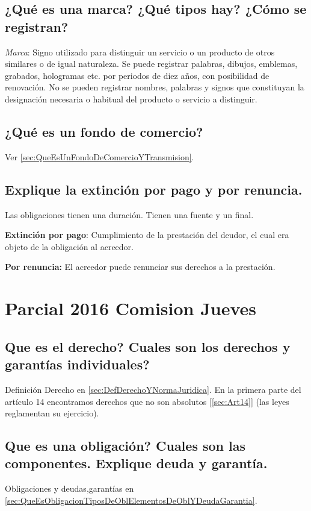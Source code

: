 \documentclass{article}
\begin{document}
\subsection{¿Qué es una marca? ¿Qué tipos hay? ¿Cómo se registran?}
\textit{Marca}: Signo utilizado para distinguir un servicio o un producto de otros similares o de igual naturaleza. Se puede registrar palabras, dibujos, emblemas, grabados, hologramas etc. por periodos de diez años, con posibilidad de renovación. 
	No se pueden registrar nombres, palabras y signos que constituyan la designación necesaria o habitual del producto o servicio a distinguir.

\subsection{¿Qué es un fondo de comercio?}
Ver \ref{sec:QueEsUnFondoDeComercioYTransmision}.
\subsection{Explique la extinción por pago y por renuncia.}
Las obligaciones tienen una duración. Tienen una fuente y un final. 

\textbf{Extinción por pago}: Cumplimiento de la prestación del deudor, el cual era objeto de la obligación al acreedor.

\textbf{Por renuncia:} El acreedor puede renunciar sus derechos a la prestación.


\section{Parcial 2016 Comision Jueves}
\subsection{Que es el derecho? Cuales son los derechos y garantías individuales?}
Definición Derecho en \ref{sec:DefDerechoYNormaJuridica}. En la primera parte del artículo 14 encontramos derechos que no son absolutos [\ref{sec:Art14}] (las leyes reglamentan su ejercicio).
\subsection{Que es una obligación? Cuales son las componentes. Explique deuda y garantía.}
Obligaciones y deudas,garantías en \ref{sec:QueEsObligacionTiposDeOblElementosDeOblYDeudaGarantia}.
\end{document}
